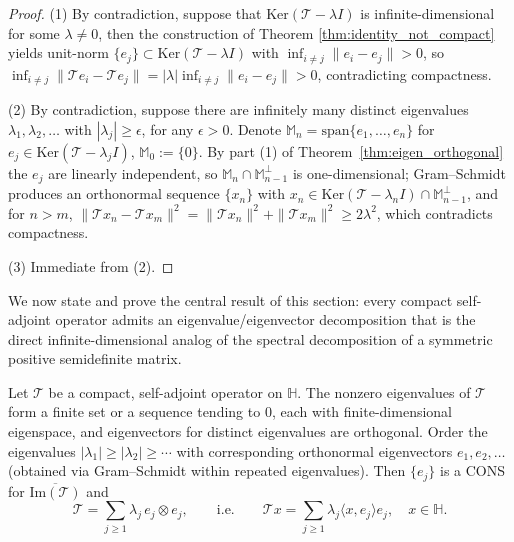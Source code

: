 \begin{proof}
(1) By contradiction, suppose that $\mathrm{Ker}(\mathcal{T}-\lambda I)$ is infinite-dimensional for
some $\lambda\neq 0$, then the construction of Theorem
\ref{thm:identity_not_compact} yields unit-norm $\{e_j\}\subset\mathrm{Ker}
(\mathcal{T}-\lambda I)$ with $\inf_{i\neq j}\|e_i-e_j\|>0$, so
$\inf_{i\neq j}\|\mathcal{T}e_i-\mathcal{T}e_j\| = |\lambda|\inf_{i\neq j}
\|e_i-e_j\|>0$, contradicting compactness.

(2) By contradiction, suppose there are infinitely many distinct eigenvalues $\lambda_1,\lambda_2,\dots$ with
$|\lambda_j|\geq\epsilon$, for any $\epsilon>0$. Denote $\mathbb{M}_n=\mathrm{span}\{e_1,\dots,e_n\}$ for $e_j\in\mathrm{Ker}(\mathcal{T}-\lambda_jI)$,
$\mathbb{M}_0:=\{0\}$. By
part (1) of Theorem~\ref{thm:eigen_orthogonal} the $e_j$ are linearly
independent, so $\mathbb{M}_n\cap\mathbb{M}_{n-1}^\perp$ is
one-dimensional; Gram--Schmidt produces an orthonormal sequence $\{x_n\}$
with $x_n\in\mathrm{Ker}(\mathcal{T}-\lambda_nI)\cap\mathbb{M}_{n-1}^\perp$,
and for $n>m$, $\|\mathcal{T}x_n-\mathcal{T}x_m\|^2 = \|\mathcal{T}x_n\|^2+
\|\mathcal{T}x_m\|^2 \geq 2\lambda^2$, which contradicts compactness.

(3) Immediate from (2).
\end{proof}

We now state and prove the central result of this section: every compact
self-adjoint operator admits an eigenvalue/eigenvector decomposition that
is the direct infinite-dimensional analog of the spectral decomposition of
a symmetric positive semidefinite matrix.

\begin{theorem}
\label{thm:spectral_theorem}
Let $\mathcal{T}$ be a compact, self-adjoint operator on $\mathbb{H}$. The
nonzero eigenvalues of $\mathcal{T}$ form a finite set or a sequence
tending to $0$, each with finite-dimensional eigenspace, and eigenvectors
for distinct eigenvalues are orthogonal. Order the eigenvalues
$|\lambda_1|\geq|\lambda_2|\geq\cdots$ with corresponding orthonormal
eigenvectors $e_1,e_2,\dots$ (obtained via Gram--Schmidt within repeated
eigenvalues). Then $\{e_j\}$ is a CONS for $\overline{\mathrm{Im}
(\mathcal{T})}$ and
\begin{equation}
\mathcal{T} = \sum_{j\geq 1}\lambda_j\, e_j\otimes e_j, \qquad\text{i.e.}
\qquad \mathcal{T}x = \sum_{j\geq 1}\lambda_j\langle x,e_j\rangle e_j,
\quad x\in\mathbb{H}.
\label{eq:spectral_decomp}
\end{equation}
\end{theorem}

